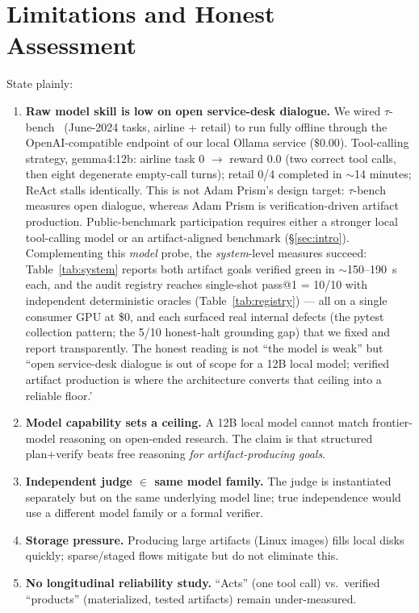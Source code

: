 \documentclass[11pt]{article}
\begin{document}
\section{Limitations and Honest Assessment}\label{sec:limits}
State plainly:
\begin{enumerate}
  \item \textbf{Raw model skill is low on open service-desk dialogue.} We wired
        $\tau$-bench~\cite{tau} (June-2024 tasks, airline + retail) to run fully offline
        through the
        OpenAI-compatible endpoint of our local Ollama service ($\$0.00$). Tool-calling
        strategy, gemma4:12b: airline task 0 $\rightarrow$ reward 0.0 (two correct tool
        calls, then eight degenerate empty-call turns); retail 0/4 completed in $\sim$14
        minutes; ReAct stalls identically. This is not Adam Prism's design target:
        $\tau$-bench measures open dialogue, whereas Adam Prism is verification-driven
        artifact production. Public-benchmark participation requires either a stronger
        local tool-calling model or an artifact-aligned benchmark (\S\ref{sec:intro}).
        Complementing this \emph{model} probe, the \emph{system}-level measures succeed:
        Table~\ref{tab:system} reports both artifact goals verified green in $\sim$150--190~s
        each, and the audit registry reaches single-shot pass@1 = 10/10 with independent
        deterministic oracles (Table~\ref{tab:registry}) --- all on a single consumer GPU
        at \$0, and each surfaced real internal defects (the pytest collection pattern; the
        5/10 honest-halt grounding gap) that we fixed and report transparently. The honest
        reading is not ``the model is weak'' but ``open service-desk dialogue is out of
        scope for a 12B local model; verified artifact production is where the architecture
        converts that ceiling into a reliable floor.'
  \item \textbf{Model capability sets a ceiling.} A 12B local model cannot match
        frontier-model reasoning on open-ended research. The claim is that structured
        plan+verify beats free reasoning \emph{for artifact-producing goals}.
  \item \textbf{Independent judge $\in$ same model family.} The judge is instantiated
        separately but on the same underlying model line; true independence would use a
        different model family or a formal verifier.
  \item \textbf{Storage pressure.} Producing large artifacts (Linux images) fills local
        disks quickly; sparse/staged flows mitigate but do not eliminate this.
  \item \textbf{No longitudinal reliability study.} ``Acts'' (one tool call) vs.\ verified
        ``products'' (materialized, tested artifacts) remain under-measured.
\end{enumerate}
\end{document}
